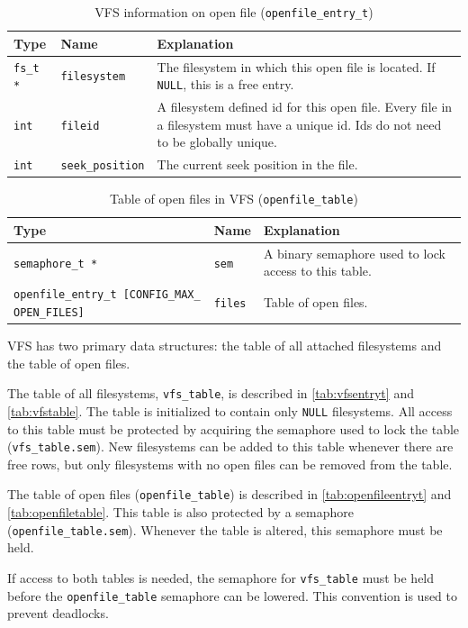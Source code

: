 \documentclass[twoside,a4paper]{report}
\newcommand{\PBS}[1]{\let\temp=\\#1\let\\=\temp}
\newlength{\tablewidth}
\newenvironment{structdescription}{%
\begin{center}%
\begin{tabular}{p{3.5cm}|p{2.5cm}|>{\PBS\raggedright}p{\tablewidth-6\tabcolsep-6cm}}%
\textbf{Type} & \textbf{Name} & \textbf{Explanation} \\ %
}{%
\end{tabular}%
\end{center}%
}
\newcommand{\structfield}[3]{%
\hline%
\texttt{#1} & \texttt{#2} & #3 \\%
}
\begin{document}
\begin{table}
\begin{structdescription}

\structfield{fs\_t *}{filesystem}{The filesystem in which this open
file is located. If \texttt{NULL}, this is a free entry.}

\structfield{int}{fileid}{A filesystem defined id for this open file.
Every file in a filesystem must have a unique id. Ids do not need to
be globally unique.}

\structfield{int}{seek\_position}{The current seek position in the file.}

\end{structdescription}
\caption{VFS information on open file (\texttt{openfile\_entry\_t})}
\label{tab:openfileentryt}
\end{table}

\begin{table}
\begin{structdescription}

\structfield{semaphore\_t *}{sem}{A binary semaphore used to lock
access to this table.}

\structfield{openfile\_entry\_t [CONFIG\_MAX\_
OPEN\_FILES]}{files}{Table of open files.}

\end{structdescription}
\caption{Table of open files in VFS (\texttt{openfile\_table})}
\label{tab:openfiletable}
\end{table}

VFS has two primary data structures: the table of all attached
filesystems and the table of open files.

The table of all filesystems,
\texttt{vfs\_table}, is
described in \autoref{tab:vfsentryt} and \autoref{tab:vfstable}. The
table is initialized to contain only \texttt{NULL} filesystems. All
access to this table must be protected by acquiring the semaphore used
to lock the table (\texttt{vfs\_table.sem}). New filesystems can be
added to this table whenever there are free rows, but only filesystems
with no open files can be removed from the table.

The table of open files
(\texttt{openfile\_table})
is described in \autoref{tab:openfileentryt} and
\autoref{tab:openfiletable}. This table is also protected by a semaphore
(\texttt{openfile\_table.sem}). Whenever the table is altered, this
semaphore must be held.

If access to both tables is needed, the semaphore for
\texttt{vfs\_table} must be held before the \texttt{openfile\_table}
semaphore can be lowered. This convention is used to prevent deadlocks.
\end{document}
